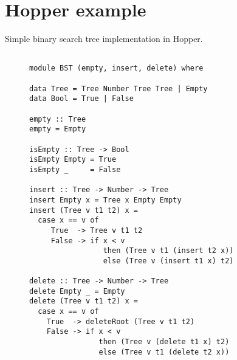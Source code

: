 \chapter{Hopper example} \label{app:hopperEx}

Simple binary search tree implementation in Hopper.

\lstset{basicstyle=\ttfamily\scriptsize}


\begin{figure}[!htb]
\centering
\begin{lstlisting} 

module BST (empty, insert, delete) where                                                           

data Tree = Tree Number Tree Tree | Empty  
data Bool = True | False                                                                            

empty :: Tree                                                                                        
empty = Empty                                                                                       

isEmpty :: Tree -> Bool                                                                             
isEmpty Empty = True                                                                             
isEmpty _     = False                                                                               

insert :: Tree -> Number -> Tree                                                                    
insert Empty x = Tree x Empty Empty                                                                 
insert (Tree v t1 t2) x =                                                                           
  case x == v of                                                                                    
     True  -> Tree v t1 t2                                                                          
     False -> if x < v                                                                              
                 then (Tree v t1 (insert t2 x))                                                     
                 else (Tree v (insert t1 x) t2)                                                     

delete :: Tree -> Number -> Tree                                                                    
delete Empty _ = Empty                                                                              
delete (Tree v t1 t2) x =                                                                           
  case x == v of                                                                                    
    True  -> deleteRoot (Tree v t1 t2)                                                              
    False -> if x < v                                                                            
                then (Tree v (delete t1 x) t2)                                                   
                else (Tree v t1 (delete t2 x))                                                   


\end{lstlisting}
\end{figure}
